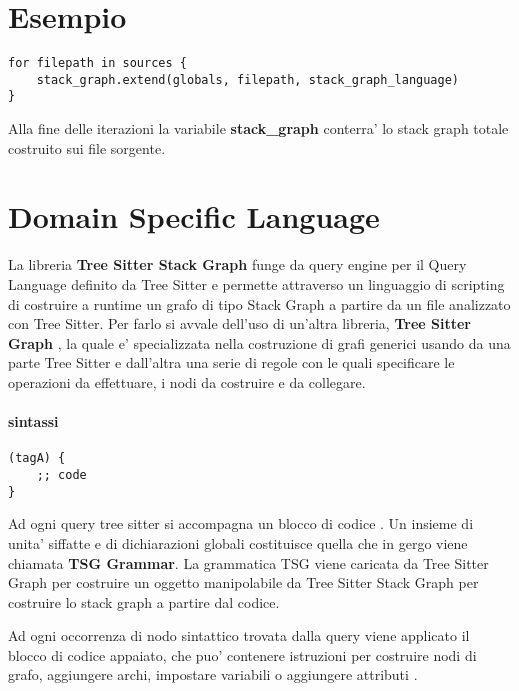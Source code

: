 \section{Esempio}

\begin{Verbatim}[samepage=true]
for filepath in sources {
    stack_graph.extend(globals, filepath, stack_graph_language)
}
\end{Verbatim}

Alla fine delle iterazioni la variabile \textbf{stack\_graph} conterra' lo stack graph totale costruito sui file sorgente.

\section{Domain Specific Language}

La libreria \textbf{Tree Sitter Stack Graph} \cite{TreeSitterStackGraph} funge da query engine per il Query Language definito da Tree Sitter e permette attraverso un linguaggio di scripting di costruire a runtime un grafo di tipo Stack Graph a partire da un file analizzato con Tree Sitter.
Per farlo si avvale dell'uso di un'altra libreria, \textbf{Tree Sitter Graph} \cite{TreeSitterGraph}, la quale e' specializzata nella costruzione di grafi generici usando da una parte Tree Sitter e dall'altra una serie di regole con le quali specificare le operazioni da effettuare, i nodi da costruire e da collegare.

\paragraph{sintassi}

\begin{Verbatim}[samepage=true]
(tagA) {
    ;; code
}
\end{Verbatim}

Ad ogni query tree sitter si accompagna un blocco di codice \cite{TreeSitterGraphReferenceHighLevelStructure}.
Un insieme di unita' siffatte e di dichiarazioni globali costituisce quella che in gergo viene chiamata \textbf{TSG Grammar}.
La grammatica TSG viene caricata da Tree Sitter Graph per costruire un oggetto manipolabile da Tree Sitter Stack Graph per costruire lo stack graph a partire dal codice.

Ad ogni occorrenza di nodo sintattico trovata dalla query viene applicato il blocco di codice appaiato, che puo' contenere istruzioni per costruire nodi di grafo, aggiungere archi, impostare variabili o aggiungere attributi \cite{TreeSitterGraphReferenceTerminology}.

